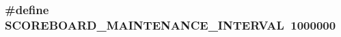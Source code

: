 \subsubsection[{\texorpdfstring{S\+C\+O\+R\+E\+B\+O\+A\+R\+D\+\_\+\+M\+A\+I\+N\+T\+E\+N\+A\+N\+C\+E\+\_\+\+I\+N\+T\+E\+R\+V\+AL}{SCOREBOARD_MAINTENANCE_INTERVAL}}]{\setlength{\rightskip}{0pt plus 5cm}\#define S\+C\+O\+R\+E\+B\+O\+A\+R\+D\+\_\+\+M\+A\+I\+N\+T\+E\+N\+A\+N\+C\+E\+\_\+\+I\+N\+T\+E\+R\+V\+AL~1000000}\hypertarget{group__APACHE__MPM__OS2_gaff56963e5ad1fd30007bf7a53b721939}{}\label{group__APACHE__MPM__OS2_gaff56963e5ad1fd30007bf7a53b721939}
